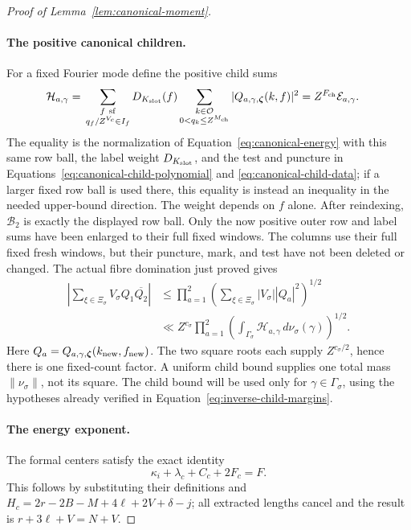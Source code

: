 \documentclass[12pt]{article}
\begin{document}
\begin{proof}[Proof of Lemma~\ref{lem:canonical-moment}]
\paragraph{The positive canonical children.}
For a fixed Fourier mode define the positive child sums
\begin{equation}\label{eq:inverse-positive-child}
 \begin{split}
 \mathcal H_{a,\gamma}={}&
 \sum_{\substack{f\ {\rm sf}\\q_f/Z^{V_c}\in I_f}}
 D_{K_{\rm slot}}(f)
 \sum_{\substack{k\in\mathcal O\\0<q_k\le Z^{M_{\rm ch}}}}
 |Q_{a,\gamma,\boldsymbol\zeta}(k,f)|^2
 =Z^{F_{\rm ch}}\mathcal E_{a,\gamma}.
 \end{split}
\end{equation}
The equality is the normalization of Equation~\eqref{eq:canonical-energy}
with this same row ball, the label weight \(D_{K_{\rm slot}}\), and
the test and puncture in Equations~\eqref{eq:canonical-child-polynomial}
and \eqref{eq:canonical-child-data}; if a larger fixed row ball is
used there, this equality is instead an inequality in the needed
upper-bound direction.  The weight depends on \(f\) alone.
After reindexing, \(\mathcal B_2\) is exactly the displayed row ball.
Only the now positive outer row and label sums have been enlarged to
their full fixed windows.  The columns use their full fixed fresh
windows, but their puncture, mark, and test have not been deleted or
changed.  The actual fibre domination just proved gives
\[
 \begin{split}
 \left|\sum_{\xi\in\Xi_\sigma}V_\sigma Q_1\overline{Q_2}\right|
 &\le\prod_{a=1}^2
       \left(\sum_{\xi\in\Xi_\sigma}|V_\sigma||Q_a|^2\right)^{1/2}\\
 &\ll Z^{c_\sigma}\prod_{a=1}^2
       \left(\int_{\Gamma_\sigma}\mathcal H_{a,\gamma}
                    \,d\nu_\sigma(\gamma)\right)^{1/2}.
 \end{split}
\]
Here \(Q_a=Q_{a,\gamma,\boldsymbol\zeta}(k_{\rm new},f_{\rm new})\).
The two square roots each supply \(Z^{c_\sigma/2}\), hence there is
one fixed-count factor.  A uniform child bound supplies one total
mass \(\|\nu_\sigma\|\), not its square.  The child bound will be
used only for \(\gamma\in\Gamma_\sigma\), using the hypotheses already verified in
Equation~\eqref{eq:inverse-child-margins}.

\paragraph{The energy exponent.}
The formal centers satisfy the exact identity
\begin{equation}\label{eq:canonical-prefactor}
 \kappa_i+\lambda_c+C_c+2F_c=F.
\end{equation}
This follows by substituting their definitions and
\(H_c=2r-2B-M+4\ell+2V+\delta-j\); all extracted lengths cancel and the
result is \(r+3\ell+V=N+V\).


\end{proof}
\end{document}
